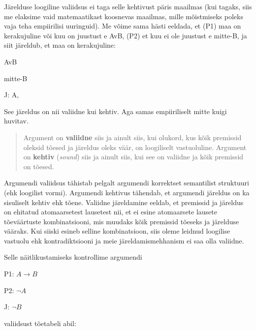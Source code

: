 \documentclass[]{book}
\begin{document}
Järelduse loogiline valiidsus ei taga selle kehtivust päris maailmas
(kui tagaks, siis me elaksime vaid matemaatikast koosnevas maailmas,
mille mõistmiseks poleks vaja teha empiirilisi uuringuid). Me võime sama
hästi eeldada, et (P1) maa on kerakujuline või kuu on juustust e AvB,
(P2) et kuu ei ole juustust e mitte-B, ja siit järeldub, et maa on
kerakujuline:

AvB

mitte-B

J: A,

See järeldus on nii valiidne kui kehtiv. Aga samas empiiriliselt mitte
kuigi huvitav.

\begin{quote}
Argument on \textbf{valiidne} siis ja ainult siis, kui olukord, kus kõik
premissid oleksid tõesed ja järeldus oleks väär, on loogiliselt
vastuoluline. Argument on \textbf{kehtiv} (\emph{sound}) siis ja ainult
siis, kui see on valiidne ja kõik premissid on tõesed.
\end{quote}

Argumendi valiidsus tähistab pelgalt argumendi korrektset semantilist
struktuuri (ehk loogilist vormi). Argumendi kehtivus tähendab, et
argumendi järeldus on ka sisuliselt kehtiv ehk tõene. Valiidne
järeldamine eeldab, et premissid ja järeldus on ehitatud atomaarsetest
lausetest nii, et ei esine atomaarsete lausete tõeväärtuste
kombinatsiooni, mis muudaks kõik premissid tõeseks ja järelduse vääraks.
Kui siiski esineb selline kombinatsioon, siis oleme leidnud loogilise
vastuolu ehk kontradiktsiooni ja meie järeldamismehhanism ei saa olla
valiidne.

Selle näitlikustamiseks kontrollime argumendi

P1: \(A \rightarrow B\)

P2: \(\neg A\)

J: \(\neg B\)

valiidsust tõetabeli abil:
\end{document}
